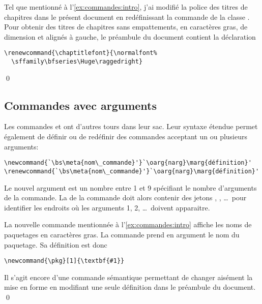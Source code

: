 \begin{exemple}
  Tel que mentionné à l'\autoref{ex:commandes:intro}, j'ai modifié la
  police des titres de chapitres dans le présent document en
  redéfinissant la commande \cmdprint{\chaptitlefont} de la classe
  . Pour obtenir des titres de chapitres sans
  empattements, en caractères gras, de dimension \cmdprint{\Huge} et
  alignés à gauche, le préambule du document contient la
  déclaration
\begin{lstlisting}
\renewcommand{\chaptitlefont}{\normalfont%
  \sffamily\bfseries\Huge\raggedright}
\end{lstlisting}
  \qed
\end{exemple}


\subsection{Commandes avec arguments}
\label{sec:commandes:commandes:avec_arg}

Les commandes \cmdprint{\newcommand} et \cmdprint{\renewcommand} ont
d'autres tours dans leur sac. Leur syntaxe étendue permet également de
définir ou de redéfinir des commandes acceptant un ou plusieurs
arguments:
\begin{lstlisting}
\newcommand{`\bs\meta{nom\_commande}'}`\oarg{narg}\marg{définition}'
\renewcommand{`\bs\meta{nom\_commande}'}`\oarg{narg}\marg{définition}'
\end{lstlisting}
Le nouvel argument  est un nombre entre 1 et 9
spécifiant le nombre d'arguments de la commande. La 
de la commande doit alors contenir des jetons , ,
\dots\ pour identifier les endroits où les arguments 1, 2, \dots\
doivent apparaitre.

\begin{exemple}
  La nouvelle commande \cmdprint{\pkg} mentionnée à
  l'\autoref{ex:commandes:intro} affiche les noms de paquetages en
  caractères gras. La commande prend en argument le nom du paquetage.
  Sa définition est donc
\begin{lstlisting}
\newcommand{\pkg}[1]{\textbf{#1}}
\end{lstlisting}
  Il s'agit encore d'une commande sémantique permettant de changer
  aisément la mise en forme en modifiant une seule définition dans le
  préambule du document. %
  \qed
\end{exemple}

